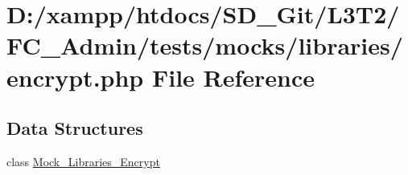 \hypertarget{_admin_2tests_2mocks_2libraries_2_encrypt_8php}{}\section{D\+:/xampp/htdocs/\+S\+D\+\_\+\+Git/\+L3\+T2/\+F\+C\+\_\+\+Admin/tests/mocks/libraries/encrypt.php File Reference}
\label{_admin_2tests_2mocks_2libraries_2_encrypt_8php}
\subsection*{Data Structures}
\begin{DoxyCompactItemize}
\item 
class \hyperlink{class_mock___libraries___encrypt}{Mock\+\_\+\+Libraries\+\_\+\+Encrypt}
\end{DoxyCompactItemize}
